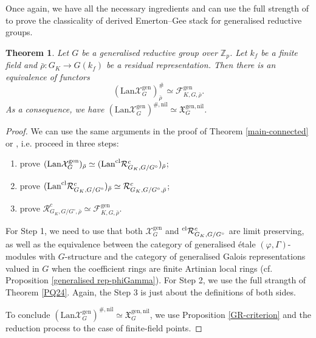 \documentclass[10pt]{article}
\newtheorem{thm}{Theorem}[section]
\numberwithin{equation}{section}
\newcommand{\frakX}{{\mathfrak X}}
\newcommand{\bZ}{{\mathbb Z}}
\newcommand{\calF}{{\mathcal F}}
\newcommand{\calR}{{\mathcal R}}
\newcommand{\calX}{{\mathcal X}}
\newcommand{\Lan}{{\mathrm{Lan}}}
\newcommand{\nil}{\mathrm{nil}}
\newcommand{\gen}{{\mathrm{gen}}}
\begin{document}
Once again, we have all the necessary ingredients and can use the full strength of \cite[Theorem 1.1]{PQ24} to prove the classicality of derived Emerton--Gee stack for generalised reductive groups.

\begin{thm}\label{main-gen}
    Let $G$ be a generalised reductive group over $\bZ_p$. Let $k_f$ be a finite field and $\bar\rho:G_K\to G(k_f)$ be a residual representation. Then there is an equivalence of functors
    \[
    (\Lan\calX^{\gen}_{G})^{\#}_{\bar \rho}\simeq\calF^{\gen}_{K,G,\bar\rho}.
    \]
    As a consequence, we have $(\Lan\calX^{\gen}_{G})^{\#,\nil}\simeq \frakX_G^{\gen,\nil}$.
\end{thm}

\begin{proof}
We can use the same arguments in the proof of Theorem \ref{main-connected} or \cite[Proposition 3.51]{Min23}, i.e. proceed in three steps:
\begin{enumerate}
    \item prove $(\Lan\calX^{\gen}_{G})_{\bar \rho}\simeq (\Lan ^{\rm cl}\calR_{G_K,G/G^{\circ}}^{c})_{\bar \rho}$;
    \item prove $(\Lan^{\rm cl}\calR_{G_K,G/G^{\circ}}^{c})_{\bar \rho}\simeq\calR_{G_K,G/G^{\circ},\bar\rho}^{c}$;
    \item prove $\calR_{G_K,G/G^{\circ},\bar\rho}^{c}\simeq \calF^{\gen}_{K,G,\bar\rho}$.
\end{enumerate}
For Step 1, we need to use that both $\calX^{\gen}_G$ and $^{\rm cl}\calR_{G_K,G/G^{\circ}}^{c}$ are limit preserving, as well as the equivalence between the category of generalised \'etale $(\varphi,\Gamma)$-modules with $G$-structure and the category of generalised Galois representations valued in $G$ when the coefficient rings are finite Artinian local rings (cf. Proposition \ref{generalised rep-phiGamma}). For Step 2, we use the full strangth of Theorem \ref{PQ24}. Again, the Step 3 is just about the definitions of both sides.

To conclude $(\Lan\calX^{\gen}_{G})^{\#,\nil}\simeq \frakX_G^{\gen,\nil}$, we use Proposition \ref{GR-criterion} and the reduction process to the case of finite-field points.
\end{proof}







    



\end{document}
